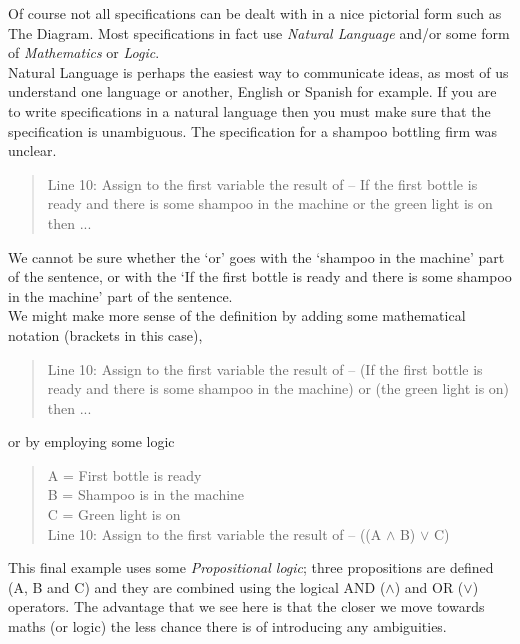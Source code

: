 Of course not all specifications can be dealt with in a nice pictorial form
such as The Diagram. Most specifications in fact use {\em Natural Language} and/or
some form of {\em Mathematics} or {\em Logic}. \\

Natural Language is perhaps the easiest way to communicate ideas, as most of 
us understand one language or another, English or Spanish for example. If you are to 
write specifications in a natural language then you must make sure that the
specification is unambiguous. The specification for a shampoo bottling firm
was unclear.

\begin{quote}
Line 10: Assign to the first variable the result of -- If the first bottle is
ready and there is some shampoo in the machine or the green light is on
then ...
\end{quote}

\noindent
We cannot be sure whether the `or' goes with the `shampoo
in the machine' part of the sentence, or with the 
`If the first bottle is ready and there is some shampoo in the machine' part 
of the sentence. \\

\noindent
We might make more sense of the definition by adding some mathematical notation
(brackets in this case),

\begin{quote}
Line 10: Assign to the first variable the result of -- (If the first bottle is
ready and there is some shampoo in the machine) or (the green light is on)
then ...
\end{quote}

\noindent
or by employing some logic

\begin{quote}
A = First bottle is ready \\
B = Shampoo is in the machine \\
C = Green light is on \\ 

Line 10: Assign to the first variable the result of -- ((A $\land$ B) $\lor$ C)
\end{quote}

\noindent
This final example uses some {\em Propositional logic}; three propositions are
defined (A, B and C) and they are combined using the logical 
AND ($\land$) and OR ($\lor$)
operators. The advantage that we see here is that the closer we move towards 
maths (or logic) the less chance there is of introducing any ambiguities. 

